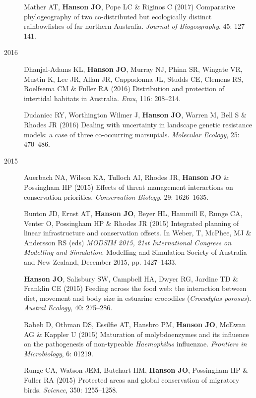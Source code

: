 \documentclass[12pt,a4paper]{article}
\begin{document}
\begin{description}
\item[] Mather AT, \textbf{Hanson JO}, Pope LC \& Riginos C (2017) Comparative phylogeography of two co-distributed but ecologically distinct rainbowfishes of far-northern Australia. \textit{Journal of Biogeography}, 45: 127--141.

\item[2016] Dhanjal-Adams KL, \textbf{Hanson JO}, Murray NJ, Phinn SR, Wingate VR, Mustin K, Lee JR, Allan JR, Cappadonna JL, Studds CE, Clemens RS, Roelfsema CM \& Fuller RA (2016) Distribution and protection of intertidal habitats in Australia. \textit{Emu}, 116: 208--214.

\item[] Dudaniec RY, Worthington Wilmer J, \textbf{Hanson JO}, Warren M, Bell S \& Rhodes JR (2016) Dealing with uncertainty in landscape genetic resistance models: a case of three co-occurring marsupials. \textit{Molecular Ecology}, 25: 470--486.

\item[2015] Auerbach NA, Wilson KA, Tulloch AI, Rhodes JR, \textbf{Hanson JO} \& Possingham HP (2015) Effects of threat management interactions on conservation priorities. \textit{Conservation Biology}, 29: 1626--1635.

\item[] Bunton JD, Ernst AT, \textbf{Hanson JO}, Beyer HL, Hammill E, Runge CA, Venter O, Possingham HP \& Rhodes JR (2015) Integrated planning of linear infrastructure and conservation offsets. In Weber, T, McPhee, MJ \& Andersson RS (eds) \textit{MODSIM 2015, 21st International Congress on Modelling and Simulation}. Modelling and Simulation Society of Australia and New Zealand, December 2015, pp. 1427--1433.

\item[] \textbf{Hanson JO}, Salisbury SW, Campbell HA, Dwyer RG, Jardine TD \& Franklin CE (2015) Feeding across the food web: the interaction between diet, movement and body size in estuarine crocodiles (\textit{Crocodylus porosus}). \textit{Austral Ecology}, 40: 275--286.

\item[] Rabeb D, Othman DS, Essilfie AT, Hansbro PM, \textbf{Hanson JO}, McEwan AG \& Kappler U (2015) Maturation of molybdoenzymes and its influence on the pathogenesis of non-typeable \textit{Haemophilus} influenzae. \textit{Frontiers in Microbiology}, 6: 01219.

\item[] Runge CA, Watson JEM, Butchart HM, \textbf{Hanson JO}, Possingham HP \& Fuller RA (2015) Protected areas and global conservation of migratory birds. \textit{Science}, 350: 1255--1258.

\end{description}
\end{document}
